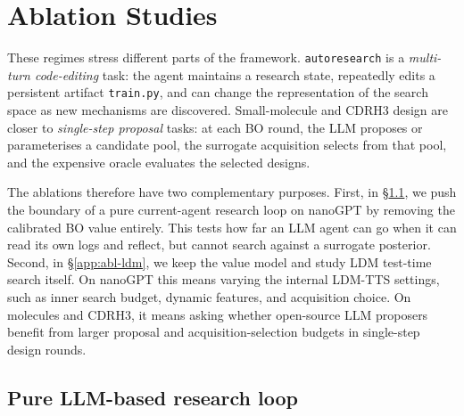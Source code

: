 \section{Ablation Studies}
\label{app:ablation}

These regimes stress different parts of the framework. \texttt{autoresearch} is a \emph{multi-turn code-editing} task: the agent maintains a research state, repeatedly edits a persistent artifact \texttt{train.py}, and can change the representation of the search space as new mechanisms are discovered. Small-molecule and CDRH3 design are closer to \emph{single-step proposal} tasks: at each BO round, the LLM proposes or parameterises a candidate pool, the surrogate acquisition selects from that pool, and the expensive oracle evaluates the selected designs.

The ablations therefore have two complementary purposes. First, in \S\ref{app:abl-pure-llm}, we push the boundary of a pure current-agent research loop on nanoGPT by removing the calibrated BO value entirely. This tests how far an LLM agent can go when it can read its own logs and reflect, but cannot search against a surrogate posterior. Second, in \S\ref{app:abl-ldm}, we keep the value model and study LDM test-time search itself. On nanoGPT this means varying the internal LDM-TTS settings, such as inner search budget, dynamic features, and acquisition choice. On molecules and CDRH3, it means asking whether open-source LLM proposers benefit from larger proposal and acquisition-selection budgets in single-step design rounds.

\subsection{Pure LLM-based research loop}\label{app:abl-pure-llm}

